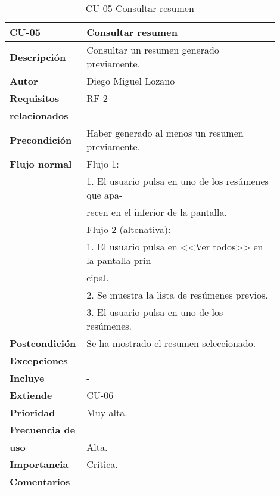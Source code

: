 \begin{longtable}{>{\raggedright}b{0.2\linewidth}>{\raggedright\arraybackslash}b{0.7\linewidth}}
	\toprule
	\textbf{CU-05} & \textbf{Consultar resumen} \\
	\toprule
	\endhead
	
	\toprule
	\caption{CU-05 Consultar resumen}
	\endfoot
	
	\small{\textbf{Descripción}} & Consultar un resumen generado previamente. \\
	\small{\textbf{Autor}} & Diego Miguel Lozano \\
	\small{\textbf{Requisitos}} & RF-2  \\
	\small{\textbf{relacionados}} & \\
	\small{\textbf{Precondición}} &  Haber generado al menos un resumen previamente. \\
	\small{\textbf{Flujo normal}} & \small{Flujo 1:} \\
	& \quad \small{1. El usuario pulsa en uno de los resúmenes que apa-} \\
	& \qquad \small{recen en el inferior de la pantalla.} \\
	& \small{Flujo 2 (altenativa):} \\
	& \quad \small{1. El usuario pulsa en <<Ver todos>> en la pantalla prin-} \\
	& \qquad \small{cipal.} \\
	& \quad \small{2. Se muestra la lista de resúmenes previos.} \\
	& \quad \small{3. El usuario pulsa en uno de los resúmenes.} \\
	\small{\textbf{Postcondición}} & Se ha mostrado el resumen seleccionado. \\
	\small{\textbf{Excepciones}} & - \\
	\small{\textbf{Incluye}} & -\\
	\small{\textbf{Extiende}} & CU-06 \\
	\small{\textbf{Prioridad}} & Muy alta. \\
	\small{\textbf{Frecuencia de}} & \\
	\small{\textbf{uso}} & Alta. \\
	\small{\textbf{Importancia}} & Crítica. \\
	\small{\textbf{Comentarios}} & - \\
\end{longtable}


